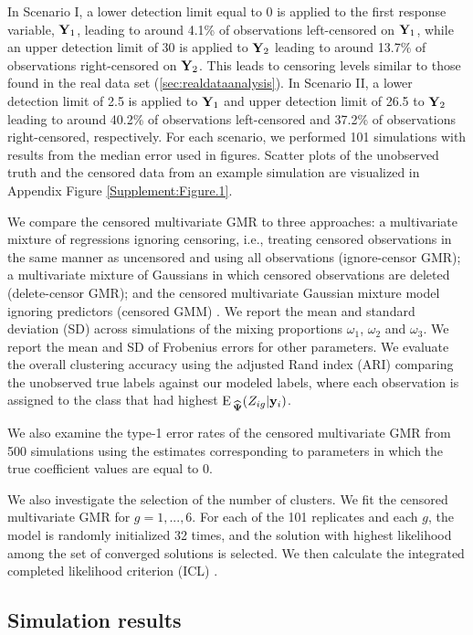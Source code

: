 \documentclass{interact}
\theoremstyle{plain}
\theoremstyle{definition}
\theoremstyle{remark}
\begin{document}
In Scenario I, a lower detection limit equal to 0 is applied to the first response variable, $\mathbf{Y}_1$,  leading to around 4.1\% of observations left-censored on $\mathbf{Y}_1$, while an upper detection limit of 30 is applied to $\mathbf{Y}_2$ leading to around 13.7\% of observations right-censored on $\mathbf{Y}_2$. This leads to censoring levels similar to those found in the real data set (\cref{sec:realdataanalysis}). In Scenario II, a lower detection limit of 2.5 is applied to $\mathbf{Y}_1$ and upper detection limit of 26.5 to $\mathbf{Y}_2$ leading to around 40.2\% of observations left-censored and 37.2\% of observations right-censored, respectively. For each scenario, we performed 101 simulations with results from the median error used in figures. Scatter plots of the unobserved truth and the censored data from an example simulation are visualized in Appendix Figure \ref{Supplement:Figure.1}. 

We compare the censored multivariate GMR to three approaches: a multivariate mixture of regressions ignoring censoring, i.e., treating censored observations in the same manner as uncensored and using all observations (ignore-censor GMR); a multivariate mixture of Gaussians in which censored observations are deleted (delete-censor GMR); and the censored multivariate Gaussian mixture model ignoring predictors (censored GMM) \citep{Lee2012}. We report the mean and standard deviation (SD) across simulations of the mixing proportions $\omega_1$, $\omega_2$ and $\omega_3$. We report the mean and SD of Frobenius errors for other parameters. We evaluate the overall clustering accuracy using the adjusted Rand index (ARI) comparing the unobserved true labels against our modeled labels, where each observation is assigned to the class that had highest ${\rm E}\,_{\widehat{\bm{\Psi}}} (Z_{ig}|\mathbf{y}_i)$. 

We also examine the type-1 error rates of the censored multivariate GMR from 500 simulations using the estimates corresponding to parameters in which the true coefficient values are equal to 0.

We also investigate the selection of the number of clusters. We fit the censored multivariate GMR for $g=1,...,6$. For each of the 101 replicates and each $g$, the model is randomly initialized 32 times, and the solution with highest likelihood among the set of converged solutions is selected. We then calculate the integrated completed likelihood criterion (ICL) \citep{Biernacki2000}. 


\subsection{Simulation results}
\end{document}
